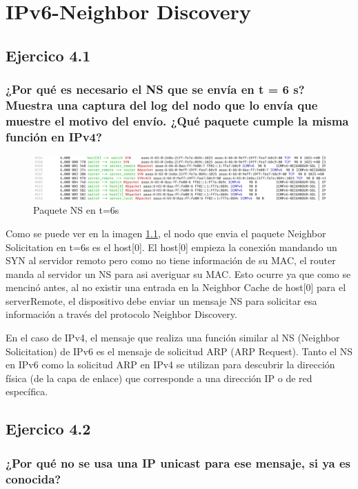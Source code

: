 \chapter{IPv6-Neighbor Discovery}
\label{chap:ipv6_nd}

\section{Ejercico 4.1}
\subsection{¿Por qué es necesario el NS que se envía en t = 6 s? Muestra una captura del log del nodo que lo envía que muestre el motivo del envío. ¿Qué paquete cumple la misma función en IPv4?}

\begin{figure}[H]
    \centering
    \includegraphics[width=135mm, scale=0.75]{imaxes/captura_ejer4_1.png}
    \caption{Paquete NS en t=6s}
    \label{fig:paquete_ns_t6}
\end{figure}

Como se puede ver en la imagen \ref{fig:paquete_ns_t6}, el nodo que envia el paquete Neighbor Solicitation en t=6s es el host[0]. El host[0] empieza la conexión mandando un SYN al servidor remoto pero como no tiene información de su MAC, el router manda al servidor un NS para asi averiguar su MAC. Esto ocurre ya que como se mencinó antes, al no existir una entrada en la Neighbor Cache de host[0] para el serverRemote, el dispositivo debe enviar un mensaje NS para solicitar esa información a través del protocolo Neighbor Discovery.


En el caso de IPv4, el mensaje que realiza una función similar al NS (Neighbor Solicitation) de IPv6 es el mensaje de solicitud ARP (ARP Request). Tanto el NS en IPv6 como la solicitud ARP en IPv4 se utilizan para descubrir la dirección física (de la capa de enlace) que corresponde a una dirección IP o de red específica.

\section{Ejercico 4.2}
\subsection{¿Por qué no se usa una IP unicast para ese mensaje, si ya es conocida?}

